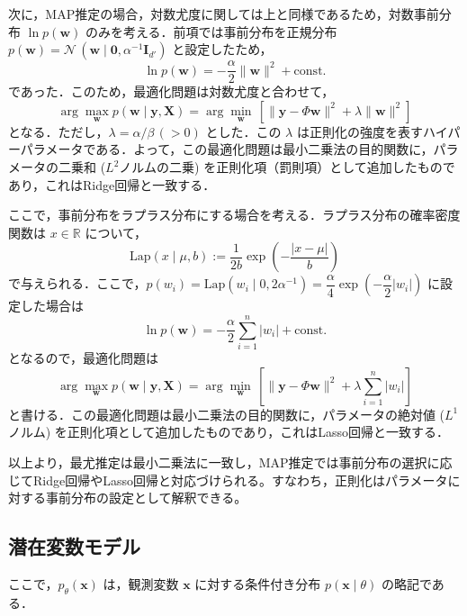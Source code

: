 \documentclass[titlepage]{ltjsbook}
\begin{document}
次に，MAP推定の場合，対数尤度に関しては上と同様であるため，対数事前分布 $\ln p(\mathbf{w})$ のみを考える．前項では事前分布を正規分布 $p(\mathbf{w})=\mathcal{N}\,\left(\mathbf{w}\mid \mathbf{0},\alpha^{-1} \mathbf{I}_{d'}\right)$ と設定したため，
\begin{equation}
\ln p(\mathbf{w}) = -\frac{\alpha}{2}\lVert \mathbf{w}\rVert^2 + \text{const.}
\end{equation}
であった．このため，最適化問題は対数尤度と合わせて，
\begin{equation}
\arg\max_{\mathbf{w}} p(\mathbf{w} \mid \mathbf{y}, \mathbf{X}) =\arg\min_{\mathbf{w}}\, \left[\lVert \mathbf{y}-\Phi\mathbf{w}\rVert^2 + \lambda \lVert \mathbf{w}\rVert^2 \right]
\end{equation}
となる．ただし，$\lambda = \alpha / \beta\, (>0)$ とした．この $\lambda$ は正則化の強度を表すハイパーパラメータである．よって，この最適化問題は最小二乗法の目的関数に，パラメータの二乗和 ($L^2$ノルムの二乗) を正則化項（罰則項）として追加したものであり，これはRidge回帰と一致する．

ここで，事前分布をラプラス分布にする場合を考える．ラプラス分布の確率密度関数は $x\in \mathbb{R}$ について，
\begin{equation}
\textrm{Lap}(x\mid \mu, b):=\dfrac{1}{2b}\exp\left(-\dfrac{\lvert x-\mu\rvert}{b}\right)
\end{equation}
で与えられる．ここで，$p(w_i)=\textrm{Lap}(w_i \mid 0, 2\alpha^{-1})=\dfrac{\alpha}{4}\exp\left(-\dfrac{\alpha}{2} \lvert w_i\rvert \right)$ に設定した場合は
\begin{equation}
\ln p(\mathbf{w}) = -\frac{\alpha}{2} \sum_{i=1}^n \lvert w_i\rvert+ \text{const.}
\end{equation}
となるので，最適化問題は
\begin{equation}
\arg\max_{\mathbf{w}} p(\mathbf{w} \mid \mathbf{y}, \mathbf{X}) =\arg\min_{\mathbf{w}}\, \left[\lVert \mathbf{y}-\Phi\mathbf{w}\rVert^2 + \lambda\sum_{i=1}^n \lvert w_i\rvert \right]
\end{equation}
と書ける．この最適化問題は最小二乗法の目的関数に，パラメータの絶対値 ($L^1$ノルム) を正則化項として追加したものであり，これはLasso回帰と一致する．

以上より，最尤推定は最小二乗法に一致し，MAP推定では事前分布の選択に応じてRidge回帰やLasso回帰と対応づけられる。すなわち，正則化はパラメータに対する事前分布の設定として解釈できる。

\subsection{潜在変数モデル}
ここで，$p_\theta(\mathbf{x})$ は，観測変数 $\mathbf{x}$ に対する条件付き分布 $p(\mathbf{x} \mid \theta)$ の略記である．
\end{document}
